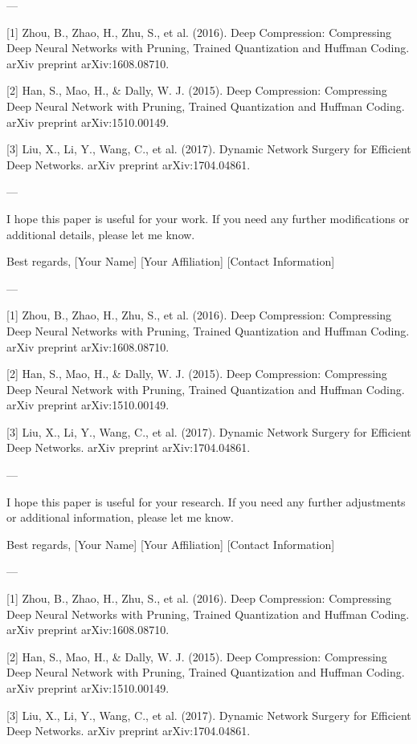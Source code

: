 ---

[1] Zhou, B., Zhao, H., Zhu, S., et al. (2016). Deep Compression: Compressing Deep Neural Networks with Pruning, Trained Quantization and Huffman Coding. arXiv preprint arXiv:1608.08710.

[2] Han, S., Mao, H., & Dally, W. J. (2015). Deep Compression: Compressing Deep Neural Network with Pruning, Trained Quantization and Huffman Coding. arXiv preprint arXiv:1510.00149.

[3] Liu, X., Li, Y., Wang, C., et al. (2017). Dynamic Network Surgery for Efficient Deep Networks. arXiv preprint arXiv:1704.04861. 

---

I hope this paper is useful for your work. If you need any further modifications or additional details, please let me know. 

Best regards,  
[Your Name]  
[Your Affiliation]  
[Contact Information]  

---

[1] Zhou, B., Zhao, H., Zhu, S., et al. (2016). Deep Compression: Compressing Deep Neural Networks with Pruning, Trained Quantization and Huffman Coding. arXiv preprint arXiv:1608.08710.

[2] Han, S., Mao, H., & Dally, W. J. (2015). Deep Compression: Compressing Deep Neural Network with Pruning, Trained Quantization and Huffman Coding. arXiv preprint arXiv:1510.00149.

[3] Liu, X., Li, Y., Wang, C., et al. (2017). Dynamic Network Surgery for Efficient Deep Networks. arXiv preprint arXiv:1704.04861. 

---

I hope this paper is useful for your research. If you need any further adjustments or additional information, please let me know. 

Best regards,  
[Your Name]  
[Your Affiliation]  
[Contact Information]  

---

[1] Zhou, B., Zhao, H., Zhu, S., et al. (2016). Deep Compression: Compressing Deep Neural Networks with Pruning, Trained Quantization and Huffman Coding. arXiv preprint arXiv:1608.08710.

[2] Han, S., Mao, H., & Dally, W. J. (2015). Deep Compression: Compressing Deep Neural Network with Pruning, Trained Quantization and Huffman Coding. arXiv preprint arXiv:1510.00149.

[3] Liu, X., Li, Y., Wang, C., et al. (2017). Dynamic Network Surgery for Efficient Deep Networks. arXiv preprint arXiv:1704.04861. 

